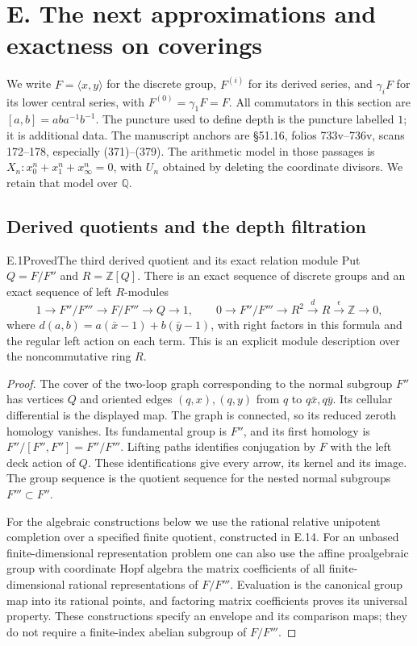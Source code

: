 \section{E. The next approximations and exactness on coverings}
\label{sec:E}

We write $F=\langle x,y\rangle$ for the discrete group, $F^{(i)}$
for its derived series, and $\gamma_iF$ for its lower central series,
with $F^{(0)}=\gamma_1F=F$. All commutators in this section are
$[a,b]=aba^{-1}b^{-1}$. The puncture used to define depth is the
puncture labelled $1$; it is additional data. The manuscript anchors
are \S51.16, folios 733v--736v, scans 172--178, especially (371)--(379).
The arithmetic model in those passages is
$X_n:x_0^n+x_1^n+x_\infty^n=0$, with $U_n$ obtained by deleting the
coordinate divisors. We retain that model over $\mathbb Q$.

\subsection{Derived quotients and the depth filtration}

\begin{statement}{E.1}{Proved}{The third derived quotient and its exact relation module}
Put $Q=F/F''$ and $R=\mathbb Z[Q]$. There is an exact sequence of
discrete groups and an exact sequence of left $R$-modules
\[
 1\longrightarrow F''/F'''\longrightarrow F/F'''
       \longrightarrow Q\longrightarrow1,
 \qquad
 0\longrightarrow F''/F'''\longrightarrow R^2
 \xrightarrow{d}R\xrightarrow{\epsilon}\mathbb Z\longrightarrow0,
\]
where $d(a,b)=a(\bar x-1)+b(\bar y-1)$, with right factors in this
formula and the regular left action on each term. This is an explicit
module description over the noncommutative ring $R$.
\end{statement}
\begin{proof}
The cover of the two-loop graph corresponding to the normal subgroup
$F''$ has vertices $Q$ and oriented edges $(q,x),(q,y)$ from $q$ to
$q\bar x,q\bar y$. Its cellular differential is the displayed map.
The graph is connected, so its reduced zeroth homology vanishes.
Its fundamental group is $F''$, and its first homology is
$F''/[F'',F'']=F''/F'''$. Lifting paths identifies conjugation by
$F$ with the left deck action of $Q$. These identifications give every
arrow, its kernel and its image. The group sequence is the quotient
sequence for the nested normal subgroups $F'''\subset F''$.

For the algebraic constructions below we use the rational relative
unipotent completion over a specified finite quotient, constructed in
E.14. For an unbased finite-dimensional representation problem one
can also use the affine proalgebraic group with coordinate Hopf algebra
the matrix coefficients of all finite-dimensional rational
representations of $F/F'''$. Evaluation is the canonical group map
into its rational points, and factoring matrix coefficients proves
its universal property. These constructions specify an envelope and
its comparison maps; they do not require a finite-index abelian
subgroup of $F/F'''$.
\end{proof}

